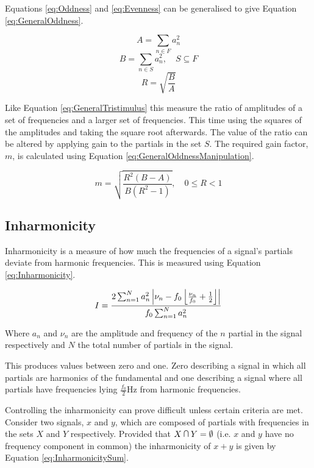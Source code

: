 		Equations \ref{eq:Oddness} and \ref{eq:Evenness} can be generalised to give Equation
		\ref{eq:GeneralOddness}.

		\[ A = \sum_{n \in F} a_{n}^{2} \]
		\[ B = \sum_{n \in S} a_{n}^{2}, \quad S \subseteq F \]
		\begin{equation}
			R = \sqrt{\frac{B}{A}}
			\label{eq:GeneralOddness}
		\end{equation}

		Like Equation \ref{eq:GeneralTristimulus} this measure the ratio of amplitudes of a set of frequencies and
		a larger set of frequencies. This time using the squares of the amplitudes and taking the square root
		afterwards. The value of the ratio can be altered by applying gain to the partials in the set $S$. The
		required gain factor, $m$, is calculated using Equation \ref{eq:GeneralOddnessManipulation}.

		\begin{equation}
			m = \sqrt{\frac{R^{2}(B - A)}{B(R^{2} - 1)}}, \quad 0 \leq R < 1
			\label{eq:GeneralOddnessManipulation}
		\end{equation}

	\subsection{Inharmonicity}
	\label{sec:FetureControl-Parameterisation-Inharmonicity}
		Inharmonicity is a measure of how much the frequencies of a signal's partials deviate from harmonic
		frequencies. This is measured using Equation \ref{eq:Inharmonicity}.
		
		\begin{equation}
			I = \frac{2\sum_{n = 1}^{N}a_{n}^{2}
			           \left|\nu_{n} - f_{0}\left\lfloor\frac{\nu_{n}}{f_{0}} + \frac{1}{2}\right\rfloor\right|}
				   {f_{0}\sum_{n = 1}^{N} a_{n}^{2}}
			\label{eq:Inharmonicity}
		\end{equation}

		Where $a_{n}$ and $\nu_{n}$ are the amplitude and frequency of the $n$ partial in the signal
		respectively and $N$ the total number of partials in the signal.

		This produces values between zero and one. Zero describing a signal in which all partials are harmonics of
		the fundamental and one describing a signal where all partials have frequencies lying $\frac{f_{0}}{2}$Hz
		from harmonic frequencies.

		Controlling the inharmonicity can prove difficult unless certain criteria are met. Consider two signals, $x$
		and $y$, which are composed of partials with frequencies in the sets $X$ and $Y$ respectively. Provided that
		$X \medcap Y = \emptyset$ (i.e. $x$ and $y$ have no frequency component in common) the inharmonicity of $x +
		y$ is given by Equation \ref{eq:InharmonicitySum}.


